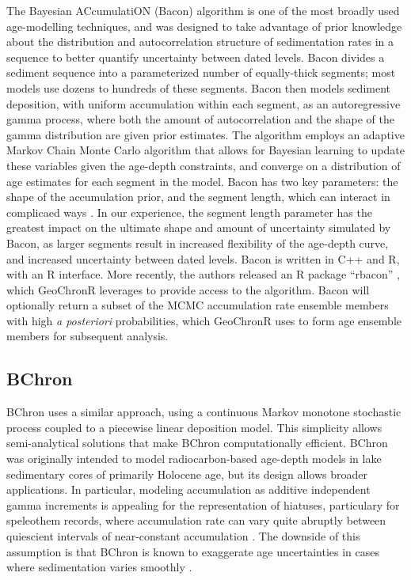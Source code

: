 \documentclass[gchron, manuscript]{copernicus}
\begin{document}
The Bayesian ACcumulatiON (Bacon) algorithm \citep{bacon} is one of the most broadly used age-modelling techniques, and was designed to take advantage of prior knowledge about the distribution and autocorrelation structure of sedimentation rates in a sequence to better quantify uncertainty between dated levels.
Bacon divides a sediment sequence into a parameterized number of equally-thick segments; most models use dozens to hundreds of these segments.
Bacon then models sediment deposition, with uniform accumulation within each segment, as an autoregressive gamma process, where both the amount of autocorrelation and the shape of the gamma distribution are given prior estimates.
The algorithm employs an adaptive Markov Chain Monte Carlo algorithm that allows for Bayesian learning to update these variables given the age-depth constraints, and converge on a distribution of age estimates for each segment in the model.
Bacon has two key parameters: the shape of the accumulation prior, and the segment length, which can interact in complicaed ways \citep{trachsel2017}.
In our experience, the segment length parameter has the greatest impact on the ultimate shape and amount of uncertainty simulated by Bacon, as larger segments result in increased flexibility of the age-depth curve, and increased uncertainty between dated levels.
Bacon is written in C++ and R, with an R interface.
More recently, the authors released an R package ``rbacon'' \citep{baconPackage}, which GeoChronR leverages to provide access to the algorithm.
Bacon will optionally return a subset of the MCMC accumulation rate ensemble members with high \emph{a posteriori} probabilities, which GeoChronR uses to form age ensemble members for subsequent analysis.

\subsection{BChron}

BChron \citep{bchron, parnell2008flexible} uses a similar approach, using a continuous Markov monotone stochastic process coupled to a piecewise linear deposition model.
This simplicity allows semi-analytical solutions that make BChron computationally efficient. BChron was originally intended to model radiocarbon-based age-depth models in lake sedimentary cores of primarily Holocene age, but its design allows broader applications.
In particular, modeling accumulation as additive independent gamma increments is appealing for the representation of hiatuses, particulary for speleothem records, where accumulation rate can vary quite abruptly between quiescient intervals of near-constant accumulation \citep{Parnell_QSR2011, PRYSM, Hu_epsl17}.
The downside of this assumption is that BChron is known to exaggerate age uncertainties in cases where sedimentation varies smoothly \citep{trachsel2017}.
\end{document}
